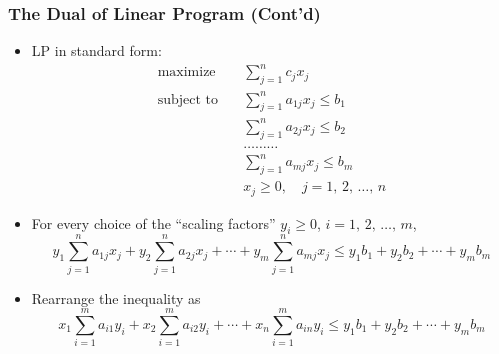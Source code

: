 \documentclass[usenames,dvipsnames,8pt]{beamer}%
\renewcommand{\ds}{\displaystyle}
\begin{document}
\begin{frame}
  \frametitle{The Dual of Linear Program (Cont'd)}
  \begin{itemize}\setlength{\itemsep=0pt}
    \item LP in standard form: 
      \begingroup
      \addtolength{\jot}{-2pt}
      \begin{align*}
        \text{maximize}  \quad& \sum_{j=1}^n c_j x_j \\
        \text{subject to}\quad& \sum_{j=1}^n a_{1j}x_j\leqslant b_1\\
                              & \sum_{j=1}^n a_{2j}x_j\leqslant b_2\\
                              & \ldots \ldots \ldots\\
                              & \sum_{j=1}^n a_{mj}x_j\leqslant b_m\\
                              & x_j\geqslant 0, \quad j= 1,\,2,\,\ldots,\,n 
      \end{align*}
      \endgroup
    \item For every choice of the ``scaling factors'' $\ds y_i\geqslant 0$, $\ds i = 1,\,2,\,\ldots,\,m$, $$y_1\sum_{j=1}^n a_{1j}x_j + y_2\sum_{j=1}^n a_{2j}x_j + \cdots + y_m\sum_{j=1}^n a_{mj}x_j \leqslant y_1 b_1 + y_2 b_2 + \cdots + y_m b_m$$ 
    \item Rearrange the inequality as $$\ds x_1\sum_{i=1}^m a_{i1}y_i + x_2\sum_{i=1}^m a_{i2}y_i + \cdots + x_n\sum_{i=1}^m a_{in}y_i \leqslant y_1 b_1 + y_2 b_2 + \cdots + y_m b_m$$ 
  \end{itemize}
\end{frame}
\end{document}
